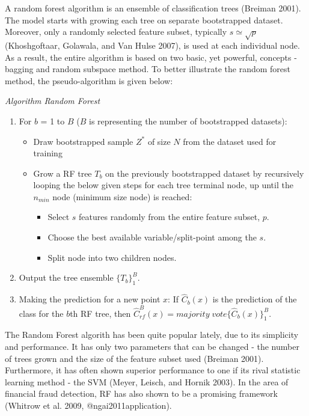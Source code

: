 \documentclass[12pt,]{article}
\providecommand{\tightlist}{%
  \setlength{\itemsep}{0pt}\setlength{\parskip}{0pt}}
\begin{document}
A random forest algorithm is an ensemble of classification trees
(Breiman 2001). The model starts with growing each tree on separate
bootstrapped dataset. Moreover, only a randomly selected feature subset,
typically \(s \simeq \sqrt{p}\) (Khoshgoftaar, Golawala, and Van Hulse
2007), is used at each individual node. As a result, the entire
algorithm is based on two basic, yet powerful, concepts - bagging and
random subspace method. To better illustrate the random forest method,
the pseudo-algorithm is given below:

\emph{Algorithm Random Forest}

\begin{enumerate}
\def\labelenumi{\arabic{enumi}.}
\tightlist
\item
  For \(b\) = 1 to \(B\) (\(B\) is representing the number of
  bootstrapped datasets):

  \begin{itemize}
  \tightlist
  \item
    Draw bootstrapped sample \(Z^*\) of size \(N\) from the dataset used
    for training
  \item
    Grow a RF tree \(T_b\) on the previously bootstrapped dataset by
    recursively looping the below given steps for each tree terminal
    node, up until the \(n_{min}\) node (minimum size node) is reached:

    \begin{itemize}
    \tightlist
    \item
      Select \(s\) features randomly from the entire feature subset,
      \(p\).
    \item
      Choose the best available variable/split-point among the \(s\).
    \item
      Split node into two children nodes.
    \end{itemize}
  \end{itemize}
\item
  Output the tree ensemble \(\{T_b\}^{B}_{1}\).
\item
  Making the prediction for a new point \(x\): If \(\widehat{C}_b(x)\)
  is the prediction of the class for the \(b\)th RF tree, then
  \(\widehat{C}_{rf}^{B}(x)=majority\;vote\{\widehat{C}_b(x)\}_{1}^{B}\).
\end{enumerate}

The Random Forest algorith has been quite popular lately, due to its
simplicity and performance. It has only two parameters that can be
changed - the number of trees grown and the size of the feature subset
used (Breiman 2001). Furthermore, it has often shown superior
performance to one if its rival statistic learning method - the SVM
(Meyer, Leisch, and Hornik 2003). In the area of financial fraud
detection, RF has also shown to be a promising framework (Whitrow et al.
2009, @ngai2011application).
\end{document}
